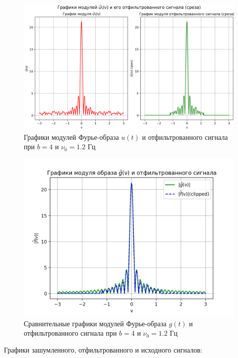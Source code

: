 \begin{figure}[ht!]
    \centering
    \includegraphics[scale=0.55]{media/1 task/high_freq/Fourier_Image_4_-1,1981981981981982.png}
    \caption{Графики модулей Фурье-образа $u(t)$ и отфильтрованного сигнала при $b=4$ и $\nu_0=1.2$ Гц}
    \label{fig:four_4_12}
\end{figure}

\begin{figure}[ht!]
    \centering
    \includegraphics[scale=0.55]{media/1 task/high_freq/Fourier_Image_Comparison_4_-1,1981981981981982.png}
    \caption{Сравнительные графики модулей Фурье-образа $g(t)$ и отфильтрованного сигнала при $b=4$ и $\nu_0=1.2$ Гц}
    \label{fig:fourc_4_12}
\end{figure}

\clearpage

Графики зашумленного, отфильтрованного и исходного сигналов:

